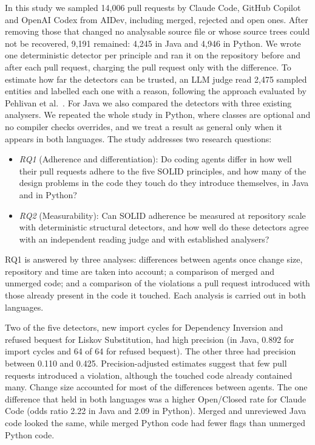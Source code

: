 \documentclass[sigconf]{acmart}
\newcommand{\RQ}[1]{\textit{RQ#1}}
\begin{document}
In this study we sampled 14,006 pull requests by Claude Code, GitHub Copilot and OpenAI Codex from
AIDev, including merged, rejected and open ones. After removing those that changed no analysable
source file or whose source trees could not be recovered, 9,191 remained: 4,245 in Java and 4,946 in
Python. We wrote one
deterministic detector per principle and ran it on the repository before and after each pull
request, charging the pull request only with the difference. To estimate how far the detectors can be
trusted, an LLM judge read 2,475 sampled entities and labelled each one with a reason, following the
approach evaluated by Pehlivan et al.~\cite{pehlivan2025solid}. For Java we also compared the
detectors with three existing analysers. We repeated the whole study in Python, where classes are
optional and no compiler checks overrides, and we treat a result as general only when it appears in
both languages. The study addresses two research questions:

\begin{itemize}
\item \RQ{1} (Adherence and differentiation): Do coding agents differ in how well their pull requests
adhere to the five SOLID principles, and how many of the design problems in the code they touch do
they introduce themselves, in Java and in Python?
\item \RQ{2} (Measurability): Can SOLID adherence be measured at repository scale with deterministic
structural detectors, and how well do these detectors agree with an independent reading judge and
with established analysers?
\end{itemize}

\noindent RQ1 is answered by three analyses: differences between agents once change size,
repository and time are taken into account; a comparison of merged and unmerged code; and a
comparison of the violations a pull request introduced with those already present in the code it
touched. Each analysis is carried out in both languages.

Two of the five detectors, new import cycles for Dependency Inversion and refused bequest for Liskov
Substitution, had high precision (in Java, 0.892 for import cycles and 64 of 64 for refused bequest).
The other three had precision between 0.110 and 0.425.
Precision-adjusted estimates suggest that few pull requests introduced a violation, although the
touched code already contained many. Change size accounted for most of the differences between
agents. The one
difference that held in both languages was a higher Open/Closed rate for Claude Code (odds ratio 2.22
in Java and 2.09 in Python). Merged and unreviewed Java code looked the same, while merged Python code
had fewer flags than unmerged Python code.
\end{document}
